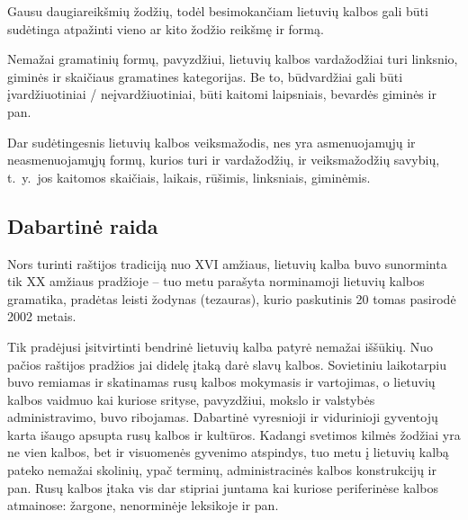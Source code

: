 \begin{multicols}{2}
Gausu daugiareikšmių žodžių, todėl besimokančiam lietuvių kalbos gali būti sudėtinga atpažinti vieno ar kito žodžio reikšmę ir formą.

Nemažai gramatinių formų, pavyzdžiui, lietuvių kalbos vardažodžiai turi linksnio, giminės ir skaičiaus gramatines kategorijas. Be to, būdvardžiai gali būti įvardžiuotiniai / neįvardžiuotiniai, būti kaitomi laipsniais, bevardės giminės ir pan.

Dar sudėtingesnis lietuvių kalbos veiksmažodis, nes yra asmenuojamųjų ir neasmenuojamųjų formų, kurios turi ir vardažodžių, ir veiksmažodžių savybių, t.~y.~jos kaitomos skaičiais, laikais, rūšimis, linksniais, giminėmis.


\subsection{Dabartinė raida}

Nors turinti raštijos tradiciją nuo XVI amžiaus, lietuvių kalba buvo sunorminta tik XX amžiaus pradžioje – tuo metu parašyta norminamoji lietuvių kalbos gramatika, pradėtas leisti žodynas (tezauras), kurio paskutinis 20 tomas pasirodė 2002 metais.  

    Tik pradėjusi įsitvirtinti bendrinė lietuvių kalba patyrė nemažai iššūkių. Nuo pačios raštijos pradžios jai didelę įtaką darė slavų kalbos. Sovietiniu laikotarpiu buvo remiamas ir skatinamas rusų kalbos mokymasis ir vartojimas, o lietuvių kalbos vaidmuo kai kuriose srityse, pavyzdžiui, mokslo ir valstybės administravimo, buvo ribojamas. Dabartinė vyresnioji ir vidurinioji gyventojų karta išaugo apsupta rusų kalbos ir kultūros. Kadangi svetimos kilmės žodžiai yra ne vien kalbos, bet ir visuomenės gyvenimo atspindys, tuo metu į lietuvių kalbą pateko nemažai skolinių, ypač terminų, administracinės kalbos konstrukcijų ir pan. Rusų kalbos įtaka vis dar stipriai juntama kai kuriose periferinėse kalbos atmainose: žargone, nenorminėje leksikoje ir pan.   


\end{multicols}
